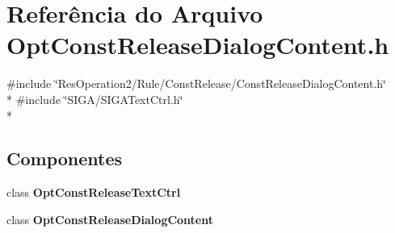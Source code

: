 \section{Referência do Arquivo Opt\+Const\+Release\+Dialog\+Content.\+h}
\label{_opt_const_release_dialog_content_8h}
{\ttfamily \#include \char`\"{}Res\+Operation2/\+Rule/\+Const\+Release/\+Const\+Release\+Dialog\+Content.\+h\char`\"{}}\\*
{\ttfamily \#include \char`\"{}S\+I\+G\+A/\+S\+I\+G\+A\+Text\+Ctrl.\+h\char`\"{}}\\*
\subsection*{Componentes}
\begin{DoxyCompactItemize}
\item 
class {\bf Opt\+Const\+Release\+Text\+Ctrl}
\item 
class {\bf Opt\+Const\+Release\+Dialog\+Content}
\end{DoxyCompactItemize}
